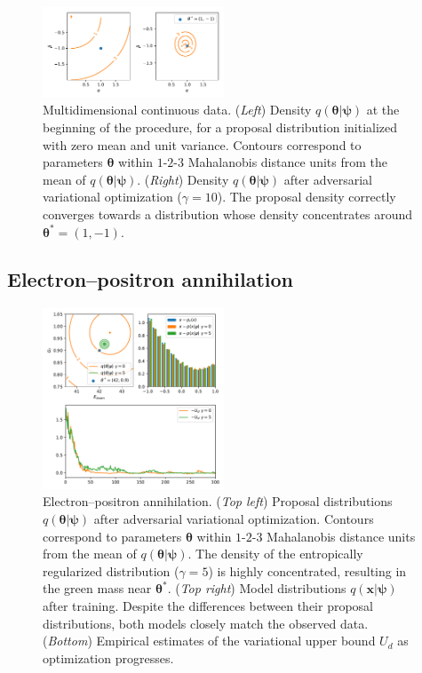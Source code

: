 \documentclass{article}
\newcommand{\glnote}[1]{\textcolor{red}{[GL: #1]}}
\newcommand{\qxpsi}{q(\mathbf{x}|\bfpsi)}
\newcommand{\bftheta}{{\bm \theta}}
\newcommand{\bfpsi}{{\bm \psi}}
\theoremstyle{plain}
\begin{document}
\begin{figure}
\centering
\includegraphics[width=0.48\textwidth]{figures/multi.pdf}
\caption{Multidimensional continuous data.
 ({\it Left}) Density $q(\bftheta|\bfpsi)$ at the beginning of the procedure, for a proposal distribution initialized with zero mean and unit variance.
              Contours correspond to parameters $\bftheta$ within $1$-$2$-$3$ Mahalanobis distance units from the mean of $q(\bftheta|\bfpsi)$.
 ({\it Right}) Density $q(\bftheta|\bfpsi)$ after adversarial variational optimization ($\gamma=10$).
               The proposal density correctly converges towards a distribution whose density concentrates around $\bftheta^* = (1, -1)$.
 }\label{fig:multi}
\end{figure}

%

\subsection{Electron--positron annihilation}

\begin{figure}[h]
\centering
\includegraphics[width=0.48\textwidth]{figures/weinberg.pdf}
\caption{Electron--positron annihilation.
({\it Top left}) Proposal distributions $q(\bftheta|\bfpsi)$ after adversarial variational optimization.
         Contours correspond to parameters $\bftheta$ within $1$-$2$-$3$ Mahalanobis distance units from the mean of $q(\bftheta|\bfpsi)$.
         The density of the entropically regularized distribution ($\gamma=5$) is  highly concentrated, resulting in the green mass near $\bftheta^*$.
({\it Top right}) Model distributions $\qxpsi$ after training. Despite the differences between their proposal distributions, both models closely match the observed data.
({\it Bottom}) Empirical estimates of the variational upper bound $U_d$ as optimization progresses.
 }\label{fig:weinberg}
\end{figure}
\end{document}

